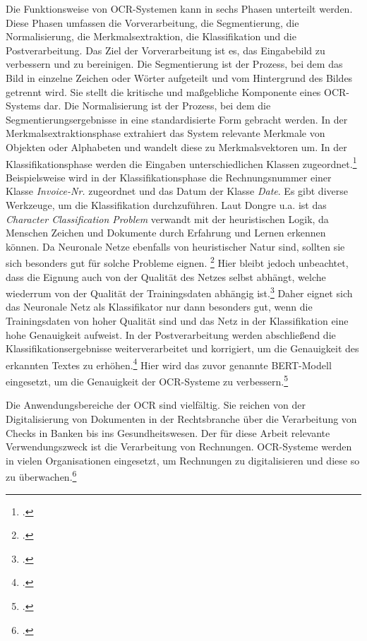 Die Funktionsweise von OCR-Systemen kann in sechs Phasen unterteilt werden. Diese Phasen umfassen die Vorverarbeitung, die Segmentierung, die Normalisierung, die Merkmalsextraktion, die Klassifikation und die Postverarbeitung. Das Ziel der Vorverarbeitung ist es, das Eingabebild zu verbessern und zu bereinigen. Die Segmentierung ist der Prozess, bei dem das Bild in einzelne Zeichen oder Wörter aufgeteilt und vom Hintergrund des Bildes getrennt wird. Sie stellt die kritische und maßgebliche Komponente eines OCR-Systems dar. Die Normalisierung ist der Prozess, bei dem die Segmentierungsergebnisse in eine standardisierte Form gebracht werden. In der Merkmalsextraktionsphase extrahiert das System relevante Merkmale von Objekten oder Alphabeten und wandelt diese zu Merkmalsvektoren um. In der Klassifikationsphase werden die Eingaben unterschiedlichen Klassen zugeordnet.\footcites[Vgl.][S.244]{hamad_detailed_2016} Beispielsweise wird in der Klassifikationsphase die Rechnungsnummer einer Klasse \emph{Invoice-Nr.} zugeordnet und das Datum der Klasse \emph{Date}. Es gibt diverse Werkzeuge, um die Klassifikation durchzuführen. Laut Dongre u.a. ist das \emph{Character Classification Problem} verwandt mit der heuristischen Logik, da Menschen Zeichen und Dokumente durch Erfahrung und Lernen erkennen können. Da Neuronale Netze ebenfalls von heuristischer Natur sind, sollten sie sich besonders gut für solche Probleme eignen. \footcites[Vgl.][S.11]{dongre_review_2010} Hier bleibt jedoch unbeachtet, dass die Eignung auch von der Qualität des Netzes selbst abhängt, welche wiederrum von der Qualität der Trainingsdaten abhängig ist.\footcites[Vgl.][S.851]{kavzoglu_increasing_2009} Daher eignet sich das Neuronale Netz als Klassifikator nur dann besonders gut, wenn die Trainingsdaten von hoher Qualität sind und das Netz in der Klassifikation eine hohe Genauigkeit aufweist. In der Postverarbeitung werden abschließend die Klassifikationsergebnisse weiterverarbeitet und korrigiert, um die Genauigkeit des erkannten Textes zu erhöhen.\footcites[Vgl.][S.246 f.]{hamad_detailed_2016} Hier wird das zuvor genannte BERT-Modell eingesetzt, um die Genauigkeit der OCR-Systeme zu verbessern.\footcites[Vgl.][S.335 f.]{nguyen_neural_2020}

Die Anwendungsbereiche der OCR sind vielfältig. Sie reichen von der Digitalisierung von Dokumenten in der Rechtsbranche über die Verarbeitung von Checks in Banken bis ins Gesundheitswesen. Der für diese Arbeit relevante Verwendungszweck ist die Verarbeitung von Rechnungen. OCR-Systeme werden in vielen Organisationen eingesetzt, um Rechnungen zu digitalisieren und diese so zu überwachen.\footcites[Vgl.][S.247 f.]{hamad_detailed_2016}

